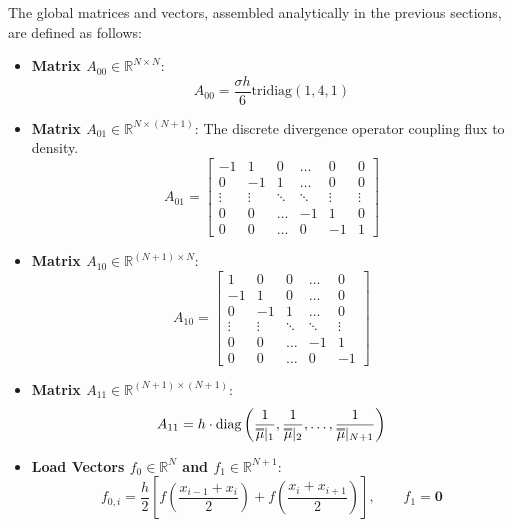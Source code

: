 \documentclass{article}
\begin{document}
The global matrices and vectors, assembled analytically in the previous sections, are defined as follows:

\begin{itemize}
    \item \textbf{Matrix $A_{00} \in \mathbb{R}^{N \times N}$}: 
    \begin{equation*}
        A_{00} = \frac{\sigma h}{6} \text{tridiag}(1, 4, 1)
    \end{equation*}
    
    \item \textbf{Matrix $A_{01} \in \mathbb{R}^{N \times (N+1)}$}: The discrete divergence operator coupling flux to density.
    \begin{equation*}
        A_{01} = 
        \begin{bmatrix}
            -1 &  1 &  0 & \dots &  0 &  0 \\
             0 & -1 &  1 & \dots &  0 &  0 \\
        \vdots & \vdots & \ddots & \ddots & \vdots & \vdots \\
             0 &  0 & \dots & -1 &  1 &  0 \\
             0 &  0 & \dots &  0 & -1 &  1
        \end{bmatrix}
    \end{equation*}

    \item \textbf{Matrix $A_{10} \in \mathbb{R}^{(N+1) \times N}$}:
    \begin{equation*}
        A_{10} = 
        \begin{bmatrix}
             1 &  0 &  0 & \dots &  0 \\
            -1 &  1 &  0 & \dots &  0 \\
             0 & -1 &  1 & \dots &  0 \\
        \vdots & \vdots & \ddots & \ddots & \vdots \\
             0 &  0 & \dots & -1 &  1 \\
             0 &  0 & \dots &  0 & -1
        \end{bmatrix}
    \end{equation*}

    \item \textbf{Matrix $A_{11} \in \mathbb{R}^{(N+1) \times (N+1)}$}:
    \begin{equation*}
        A_{11} = h \cdot \text{diag}\left( \frac{1}{\overline{\vphantom{\rule{0pt}{1.2ex}}\smash{\overline{\mu}}}|_1}, \frac{1}{\overline{\vphantom{\rule{0pt}{1.2ex}}\smash{\overline{\mu}}}|_2}, \dots, \frac{1}{\overline{\vphantom{\rule{0pt}{1.2ex}}\smash{\overline{\mu}}}|_{N+1}} \right)
    \end{equation*}

    \item \textbf{Load Vectors $f_0 \in \mathbb{R}^N$ and $f_1 \in \mathbb{R}^{N+1}$}: 
    \begin{equation*}
        f_{0,i} = \frac{h}{2} \left[ f\left( \frac{x_{i-1} + x_i }{2} \right) + f\left( \frac{x_{i} + x_{i+1} }{2} \right) \right] , \quad \quad f_1 = \mathbf{0}
    \end{equation*}
\end{itemize}
\end{document}
